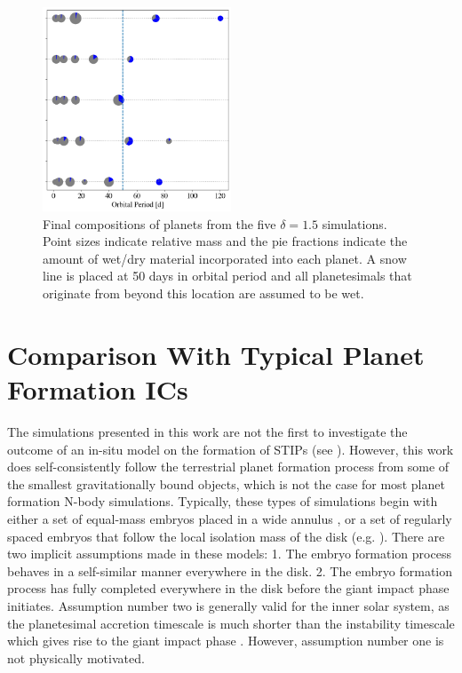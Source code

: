 \begin{figure}
\begin{center}
    \includegraphics[width=0.5\textwidth]{figures/stip/snowline.png}
    \caption{Final compositions of planets from the five $\delta = 1.5$ simulations. Point sizes indicate relative mass and the pie fractions indicate the amount of wet/dry material incorporated into each planet. A snow line is placed at 50 days in orbital period and all planetesimals that originate from beyond this location are assumed to be wet.\label{fig:snowline}}
\end{center}
\end{figure}

\section{Comparison With Typical Planet Formation ICs} \label{sec:typicalICs}

The simulations presented in this work are not the first to investigate the outcome of an in-situ model on the formation of STIPs (see \cite{hansen12}). However, this work does self-consistently follow the terrestrial planet formation process from some of the smallest gravitationally bound objects, which is not the case for most planet formation N-body simulations. Typically, these types of simulations begin with either a set of equal-mass embryos placed in a wide annulus \cite{obrien06}, or a set of regularly spaced embryos that follow the local isolation mass of the disk (e.g. \cite{raymond05, raymond06, hansen12}). There are two implicit assumptions made in these models: 1. The embryo formation process behaves in a self-similar manner everywhere in the disk. 2. The embryo formation process has fully completed everywhere in the disk before the giant impact phase initiates. Assumption number two is generally valid for the inner solar system, as the planetesimal accretion timescale is much shorter than the instability timescale which gives rise to the giant impact phase \cite{chambers96}. However, assumption number one is not physically motivated.

